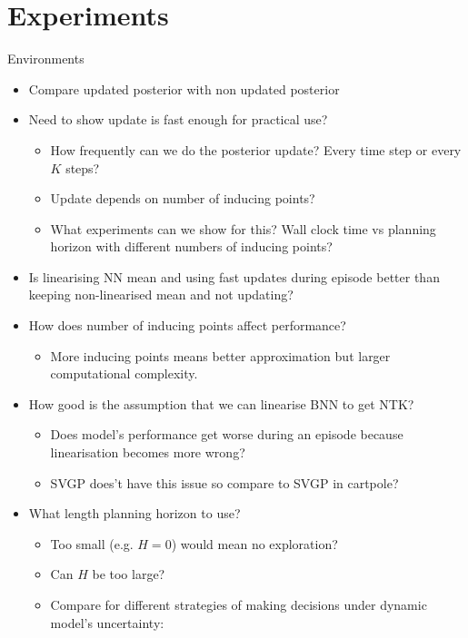 \documentclass{article}
\newcommand{\Horizon}{\ensuremath{H}}
\begin{document}
\section{Experiments}
Environments
\begin{itemize}
  \item Compare updated posterior with non updated posterior
  \item Need to show update is fast enough for practical use?
  \begin{itemize}
    \item How frequently can we do the posterior update? Every time step or every $K$ steps?
    \item Update depends on number of inducing points?
    \item What experiments can we show for this? Wall clock time vs planning horizon with different numbers of inducing points?
  \end{itemize}
  \item Is linearising NN mean and using fast updates during episode better than keeping non-linearised mean and not updating?
  \item How does number of inducing points affect performance?
  \begin{itemize}
    \item More inducing points means better approximation but larger computational complexity.
  \end{itemize}
  \item How good is the assumption that we can linearise BNN to get NTK?
  \begin{itemize}
    \item Does model's performance get worse during an episode because linearisation becomes more wrong?
    \item SVGP does't have this issue so compare to SVGP in cartpole?
  \end{itemize}
  \item What length planning horizon to use?
  \begin{itemize}
    \item Too small (e.g. $\Horizon=0$) would mean no exploration?
    \item Can $\Horizon$ be too large?
  \end{itemize}
  \begin{itemize}
  \item Compare for different strategies of making decisions under dynamic model's uncertainty:
    \begin{itemize}

\end{itemize}
\end{itemize}
\end{itemize}
\end{document}
